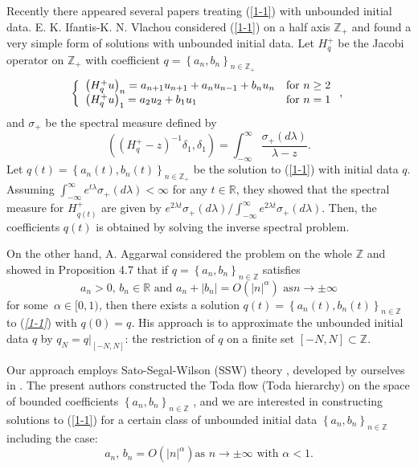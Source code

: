 \documentclass[a4paper]{article}%
\begin{document}
Recently there appeared several papers treating (\ref{1-1}) with unbounded
initial data. E. K. Ifantis-K. N. Vlachou\cite{iv} considered (\ref{1-1}) on a
half axis $\mathbb{Z}_{+}$ and found a very simple form of solutions with
unbounded initial data. Let $H_{q}^{+}$ be the Jacobi operator on
$\mathbb{Z}_{+}$ with coefficient $q=\left\{  a_{n},b_{n}\right\}
_{n\in\mathbb{Z}_{+}}$%
\[
\left\{
\begin{array}
[c]{ll}%
\left(  H_{q}^{+}u\right)  _{n}=a_{n+1}u_{n+1}+a_{n}u_{n-1}+b_{n}u_{n} &
\text{for }n\geq2\\
\left(  H_{q}^{+}u\right)  _{1}=a_{2}u_{2}+b_{1}u_{1} & \text{for }n=1
\end{array}
\right.  \text{, }%
\]
and $\sigma_{+}$ be the spectral measure defined by%
\[
\left(  \left(  H_{q}^{+}-z\right)  ^{-1}\delta_{1},\delta_{1}\right)
=\int_{-\infty}^{\infty}\dfrac{\sigma_{+}\left(  d\lambda\right)  }{\lambda
-z}\text{.}%
\]
Let $q\left(  t\right)  =\left\{  a_{n}\left(  t\right)  ,b_{n}\left(
t\right)  \right\}  _{n\in\mathbb{Z}_{+}}$ be the solution to (\ref{1-1}) with
initial data $q$. Assuming $\int_{-\infty}^{\infty}e^{t\lambda}\sigma
_{+}\left(  d\lambda\right)  <\infty$ for any $t\in\mathbb{R}$, they showed
that the spectral measure for $H_{q\left(  t\right)  }^{+}$ are given by
$e^{2\lambda t}\sigma_{+}\left(  d\lambda\right)  /\int_{-\infty}^{\infty
}e^{2\lambda t}\sigma_{+}\left(  d\lambda\right)  $. Then, the coefficients
$q\left(  t\right)  $ is obtained by solving the inverse spectral problem.

On the other hand, A. Aggarwal\cite{a} considered the problem on the whole
$\mathbb{Z}$ and showed in Proposition 4.7 that if $q=\left\{  a_{n}%
,b_{n}\right\}  _{n\in\mathbb{Z}}$ satisfies%
\[
a_{n}>0\text{, }b_{n}\in\mathbb{R}\text{ and }a_{n}+\left\vert b_{n}%
\right\vert =O\left(  \left\vert n\right\vert ^{\alpha}\right)  \text{ as
}n\rightarrow\pm\infty
\]
for some\textit{\ }$\alpha\in\lbrack0,1)$\textit{, }then there exists a
solution\textit{ }$q\left(  t\right)  =\left\{  a_{n}\left(  t\right)
,b_{n}\left(  t\right)  \right\}  _{n\in\mathbb{Z}}$\textit{ }to\textit{
}(\textit{\ref{1-1}})\textit{ }with $q(0)=q$\textit{.} His approach is to
approximate the unbounded initial data $q$ by $q_{N}=\left.  q\right\vert
_{\left[  -N,N\right]  }$: the restriction of $q$ on a finite set $\left[
-N,N\right]  \subset\mathbb{Z}$.

Our approach employs Sato-Segal-Wilson (SSW) theory \cite{sa}, \cite{sew}
developed by ourselves in \cite{z}. The present authors constructed the Toda
flow (Toda hierarchy) on the space of bounded coefficients $\left\{
a_{n},b_{n}\right\}  _{n\in\mathbb{Z}}$ \cite{z}, and we are interested in
constructing solutions to (\ref{1-1}) for a certain class of unbounded initial
data $\left\{  a_{n},b_{n}\right\}  _{n\in\mathbb{Z}}$ including the case:%
\[
a_{n}\text{, }b_{n}=O\left(  \left\vert n\right\vert ^{\alpha}\right)  \text{
\ as }n\rightarrow\pm\infty\text{ with }\alpha<1\text{.}%
\]
\end{document}
